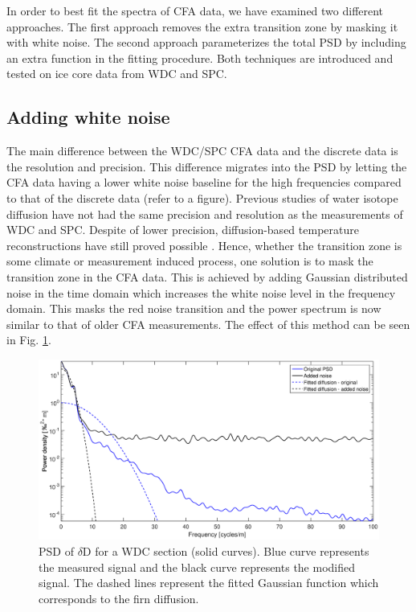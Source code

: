 \documentclass[draft, jgrga]{AGUTeX}
\begin{document}
\begin{article}
In order to best fit the spectra of CFA data, we have examined two different approaches. The first approach removes the extra transition zone by masking it with white noise. The second approach parameterizes the total PSD by including an extra function in the fitting procedure. Both techniques are introduced and tested on ice core data from WDC and SPC.

\subsection{Adding white noise}
The main difference between the WDC/SPC CFA data and the discrete data is the resolution and precision.
This difference migrates into the PSD by letting the CFA data having a lower white noise baseline for the high frequencies compared to that of the discrete data (refer to a figure).
Previous studies of water isotope diffusion have not had the same precision and resolution as the measurements of WDC and SPC. Despite of lower precision, diffusion-based temperature reconstructions have still proved possible \citep{Gkinis2014,Holme2017}.
Hence, whether the transition zone is some climate or measurement induced process,
one solution is to mask the transition zone in the CFA data.
This is achieved by adding Gaussian distributed noise in the time domain which increases the white noise level in the frequency domain.
This masks the red noise transition and the power spectrum is now similar to that of older CFA measurements.
The effect of this method can be seen in Fig. \ref{WAIS_spectrum_added_noise}.

\begin{figure}
	\includegraphics[width=.9\linewidth]{WAIS_spectrum_added_noise.eps}
	\caption{PSD of $\delta$D for a WDC section (solid curves). Blue curve represents
			the measured signal and the black curve represents the modified signal.
			The dashed lines represent the fitted Gaussian function which
			corresponds to the firn diffusion.} \label{WAIS_spectrum_added_noise}
\end{figure}


\end{article}
\end{document}
